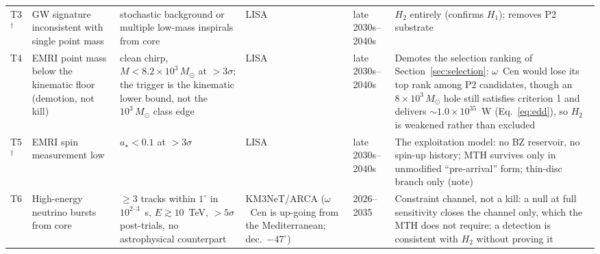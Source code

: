 \documentclass[11pt]{article}
\newcommand{\msun}{\ensuremath{M_\odot}}
\newcommand{\astar}{\ensuremath{a_\star}}
\begin{document}
\begin{table}[tbp]
\begin{tabular}{p{0.6cm}p{3.1cm}p{3.1cm}p{2.5cm}p{1.6cm}p{2.5cm}}
T3$^\dagger$ & GW signature inconsistent with single point mass & stochastic background or multiple low-mass inspirals from core & LISA & late 2030s--2040s & $H_2$ entirely (confirms $H_1$); removes P2 substrate \\
T4 & EMRI point mass below the kinematic floor (demotion, not kill) & clean chirp, $M < 8.2\times10^{3}\,\msun$ at $>3\sigma$; the trigger is the \citet{Haberle2024Nature} kinematic lower bound, not the $10^{3}\,\msun$ class edge & LISA & late 2030s--2040s & Demotes the selection ranking of Section~\ref{sec:selection}: $\omega$~Cen would lose its top rank among P2 candidates, though an $8\times10^{3}\,\msun$ hole still satisfies criterion 1 and delivers $\sim 1.0\times10^{35}$~W (Eq.~\ref{eq:edd}), so $H_2$ is weakened rather than excluded \\
T5$^\dagger$ & EMRI spin measurement low & $\astar < 0.1$ at $>3\sigma$ & LISA & late 2030s--2040s & The exploitation model: no BZ reservoir, no spin-up history; MTH survives only in unmodified ``pre-arrival'' form; thin-disc branch only (note) \\
T6 & High-energy neutrino bursts from core & $\geq 3$ tracks within $1^{\circ}$ in $10^{2\text{--}3}$~s, $E \gtrsim 10$~TeV, $>5\sigma$ post-trials, no astrophysical counterpart & KM3NeT/ARCA ($\omega$~Cen is up-going from the Mediterranean; dec.\ $-47^{\circ}$) & 2026--2035 & Constraint channel, not a kill: a null at full sensitivity closes the \citet{Dvali2023} channel only, which the MTH does not require; a detection is consistent with $H_2$ without proving it \\
\bottomrule
\end{tabular}
\end{table}
\end{document}
